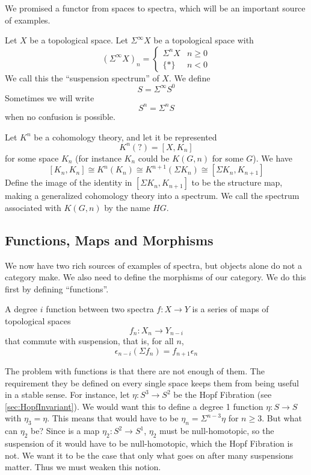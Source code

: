We promised a functor from spaces to spectra, which will be an important source of examples.  

\begin{Def}
  Let $X$ be a topological space.  Let $\Sigma^\infty X$ be a topological space with
  \[(\Sigma^\infty X)_n = \left\{\begin{array}{cc} 
  \Sigma^n X & n \ge 0\\
  \{*\} & n < 0
  \end{array}\right.\]
  We call this the ``suspension spectrum'' of $X$.
  We define 
  \[S=\Sigma^\infty S^0\]
  Sometimes we will write
  \[S^n=\Sigma^nS\]
  when no confusion is possible.  
\end{Def}


Let $K^n$ be a cohomology theory, and let it be represented
\[K^n(?)=[X,K_n]\]
for some space $K_n$ (for instance $K_n$ could be $K(G,n)$ for some $G$).  
We have
\[[K_n,K_n]\cong K^n(K_n)\cong K^{n+1}(\Sigma K_n)\cong [\Sigma K_n,K_{n+1}]\]
Define the image of the identity in $[\Sigma K_n,K_{n+1}]$ to be the structure map, making a generalized cohomology theory into a spectrum.  
We call the spectrum associated with $K(G,n)$ by the name $HG$.  


\subsection{Functions, Maps and Morphisms}

We now have two rich sources of examples of spectra, but objects alone do not a category make.  
We also need to define the morphisms of our category.  
We do this first by defining ``functions''.  
\begin{Def}
  A degree $i$ function between two spectra $f:X\to Y$ is a series of maps of topological spaces 
  \[f_n:X_n\to Y_{n-i}\]
  that commute with suspension, that is, for all $n$,
  \[\epsilon_{n-i}(\Sigma f_n)=f_{n+1}\epsilon_n\]
\end{Def}

The problem with functions is that there are not enough of them.  
The requirement they be defined on every single space keeps them from being useful in a stable sense.  
For instance, let $\eta:S^3\to S^2$ be the Hopf Fibration (see \ref{sec:HopfInvariant}).  
We would want this to define a degree 1 function $\eta:S\to S$ with $\eta_3=\eta$.  
This means that would have to be $\eta_n=\Sigma^{n-3}\eta$ for $n\ge 3$.  
But what can $\eta_2$ be?  Since is a map $\eta_2:S^2\to S^1$, $\eta_2$ must be null-homotopic, so the suspension of it would have to be null-homotopic, 
which the Hopf Fibration is not.  
We want it to be the case that only what goes on after many suspensions matter.  Thus we must weaken this notion.

